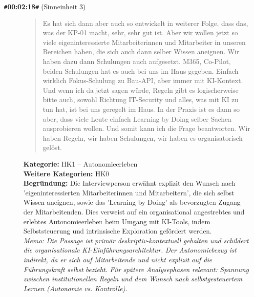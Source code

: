 \begin{description}
  \item[\texttt{\#}\textbf{00:02:18}\texttt{\#} (Sinneinheit 3)]
  \begin{quote}
  Es hat sich dann aber auch so entwickelt in weiterer Folge, dass das, was der KP-01 macht, sehr, sehr gut ist. Aber wir wollen jetzt so viele eigeninteressierte Mitarbeiterinnen und Mitarbeiter in unseren Bereichen haben, die sich auch dann selber Wissen aneignen. Wir haben dazu dann Schulungen auch aufgesetzt. M365, Co-Pilot, beiden Schulungen hat es auch bei uns im Haus gegeben. Einfach wirklich Fokus-Schulung zu Bau-API, aber immer mit KI-Kontext. Und wenn ich da jetzt sagen würde, Regeln gibt es logischerweise bitte auch, sowohl Richtung IT-Security und alles, was mit KI zu tun hat, ist bei uns geregelt im Haus. In der Praxis ist es dann so aber, dass viele Leute einfach Learning by Doing selber Sachen ausprobieren wollen. Und somit kann ich die Frage beantworten. Wir haben Regeln, wir haben Schulungen, wir haben es organisatorisch gelöst.
  \end{quote}
  \textbf{Kategorie:} HK1 -- Autonomieerleben\\
  \textbf{Weitere Kategorien:} HK0\\
  \textbf{Begr\"undung:} Die Interviewperson erwähnt explizit den Wunsch nach 'eigeninteressierten Mitarbeiterinnen und Mitarbeitern', die sich selbst Wissen aneignen, sowie das 'Learning by Doing' als bevorzugten Zugang der Mitarbeitenden. Dies verweist auf ein organisational angestrebtes und erlebtes Autonomieerleben beim Umgang mit KI-Tools, indem Selbststeuerung und intrinsische Exploration gefördert werden.
  \\\textit{Memo: Die Passage ist primär deskriptiv-kontextuell gehalten und schildert die organisationale KI-Einführungsarchitektur. Der Autonomiebezug ist indirekt, da er sich auf Mitarbeitende und nicht explizit auf die Führungskraft selbst bezieht. Für spätere Analysephasen relevant: Spannung zwischen institutionellen Regeln und dem Wunsch nach selbstgesteuertem Lernen (Autonomie vs. Kontrolle).}
\end{description}
\medskip

